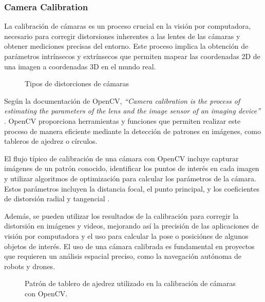    \subsubsection{Camera Calibration}

    La calibración de cámaras es un proceso crucial en la visión por computadora, necesario para corregir distorsiones inherentes a las lentes de las cámaras y obtener mediciones precisas del entorno. Este proceso implica la obtención de parámetros intrínsecos y extrínsecos que permiten mapear las coordenadas 2D de una imagen a coordenadas 3D en el mundo real.

    \begin{figure}[h!] 
    \centering 
    \caption{Tipos de distorciones de cámaras}
    \label{fig} 
    \end{figure}

    Según la documentación de OpenCV, \textit{“Camera calibration is the process of estimating the parameters of the lens and the image sensor of an imaging device”} \cite{opencv_calib3d}. OpenCV proporciona herramientas y funciones que permiten realizar este proceso de manera eficiente mediante la detección de patrones en imágenes, como tableros de ajedrez o círculos.

    El flujo típico de calibración de una cámara con OpenCV incluye capturar imágenes de un patrón conocido, identificar los puntos de interés en cada imagen y utilizar algoritmos de optimización para calcular los parámetros de la cámara. Estos parámetros incluyen la distancia focal, el punto principal, y los coeficientes de distorsión radial y tangencial \cite{opencv_tutorial_calib}.

    Además, se pueden utilizar los resultados de la calibración para corregir la distorsión en imágenes y videos, mejorando así la precisión de las aplicaciones de visión por computadora y el uso para calcular la pose o posiciónes de algunos objetos de interés. El uso de una cámara calibrada es fundamental en proyectos que requieren un análisis espacial preciso, como la navegación autónoma de robots y drones.

    \begin{figure}[h!] 
    \centering 
    \caption{Patrón de tablero de ajedrez utilizado en la calibración de cámaras con OpenCV.} \label{fig} 
    \end{figure}

